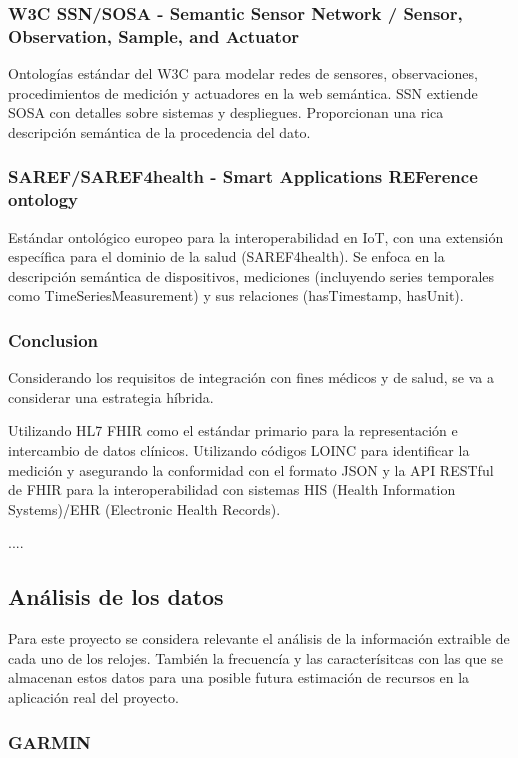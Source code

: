 \subsubsection{ W3C SSN/SOSA - Semantic Sensor Network / Sensor, Observation, Sample, and Actuator}
Ontologías estándar del W3C para modelar redes de sensores, observaciones, procedimientos de medición y actuadores en la web semántica. SSN extiende SOSA con detalles sobre sistemas y despliegues. Proporcionan una rica descripción semántica de la procedencia del dato. \cite{SSN/SOSA}

\subsubsection{ SAREF/SAREF4health - Smart Applications REFerence ontology}
Estándar ontológico europeo para la interoperabilidad en IoT, con una extensión específica para el dominio de la salud (SAREF4health). Se enfoca en la descripción semántica de dispositivos, mediciones (incluyendo series temporales como TimeSeriesMeasurement) y sus relaciones (hasTimestamp, hasUnit). \cite{SAREF4health}

\subsubsection{Conclusion}
Considerando los requisitos de integración con fines médicos y de salud, se va a considerar una estrategia híbrida. 

Utilizando HL7 FHIR como el estándar primario para la representación e intercambio de datos clínicos. Utilizando códigos LOINC para identificar la medición y asegurando la conformidad con el formato JSON y la API RESTful de FHIR para la interoperabilidad con sistemas HIS (Health Information Systems)/EHR (Electronic Health Records). 

....



\subsection{Análisis de los datos}

Para este proyecto se considera relevante el análisis de la información extraible de cada uno de los relojes. También la frecuencía y las caracterísitcas con las que se almacenan estos datos para una posible futura estimación de recursos en la aplicación real del proyecto.

\subsubsection{GARMIN}

